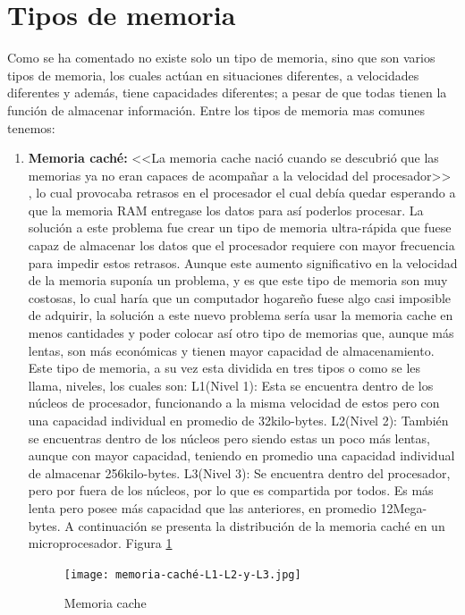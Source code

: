 \documentclass{article}
\begin{document}
\section{Tipos de memoria} \label{contenido}
Como se ha comentado no existe solo un tipo de memoria, sino que son varios tipos de memoria, los cuales actúan en situaciones diferentes, a velocidades diferentes y además, tiene capacidades diferentes; a pesar de que todas tienen la función de almacenar información. 
Entre los tipos de memoria mas comunes tenemos:
\begin{enumerate}
\item \textbf{Memoria caché:} <<La memoria cache nació cuando se descubrió que las memorias ya no eran capaces de acompañar a la velocidad del procesador>> \cite{tipos-memoria}, lo cual provocaba retrasos en el procesador el cual debía quedar esperando a que la memoria RAM entregase los datos para así poderlos procesar. La solución a este problema fue crear un tipo de memoria ultra-rápida que fuese capaz de almacenar los datos que el procesador requiere con mayor frecuencia para impedir estos retrasos.
Aunque este aumento significativo en la velocidad de la memoria suponía un problema, y es que este tipo de memoria son muy costosas, lo cual haría que un computador hogareño fuese algo casi imposible de adquirir, la solución a este nuevo problema sería usar la memoria cache en menos cantidades y poder colocar así otro tipo de memorias que, aunque más lentas, son más económicas y tienen mayor capacidad de almacenamiento. 
Este tipo de memoria, a su vez esta dividida en tres tipos o como se les llama, niveles, los cuales son:
\subitem L1(Nivel 1): Esta se encuentra dentro de los núcleos de procesador, funcionando a la misma velocidad de estos pero con una capacidad individual en promedio de 32kilo-bytes.
\subitem L2(Nivel 2): También se encuentras dentro de los núcleos pero siendo estas un poco más lentas, aunque con mayor capacidad, teniendo en promedio una capacidad individual de almacenar 256kilo-bytes.
\subitem L3(Nivel 3): Se encuentra dentro del procesador, pero por fuera de los núcleos, por lo que es compartida por todos. Es más lenta pero posee más capacidad que las anteriores, en promedio 12Mega-bytes. A continuación se presenta la distribución de la memoria caché en un microprocesador. Figura \ref{fig:memoriacachel}
    \begin{figure}[h]
        \centering
        \texttt{[image: memoria-caché-L1-L2-y-L3.jpg]}
        \caption{Memoria cache}
        \label{fig:memoriacachel}
    \end{figure}



\end{enumerate}
\end{document}
